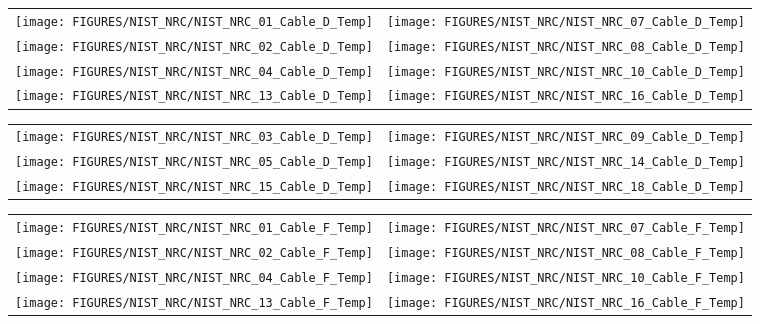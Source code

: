 \begin{figure}[p]
\begin{tabular*}{\textwidth}{l@{\extracolsep{\fill}}r}
\texttt{[image: FIGURES/NIST\_NRC/NIST\_NRC\_01\_Cable\_D\_Temp]} &
\texttt{[image: FIGURES/NIST\_NRC/NIST\_NRC\_07\_Cable\_D\_Temp]} \\
\texttt{[image: FIGURES/NIST\_NRC/NIST\_NRC\_02\_Cable\_D\_Temp]} &
\texttt{[image: FIGURES/NIST\_NRC/NIST\_NRC\_08\_Cable\_D\_Temp]} \\
\texttt{[image: FIGURES/NIST\_NRC/NIST\_NRC\_04\_Cable\_D\_Temp]} &
\texttt{[image: FIGURES/NIST\_NRC/NIST\_NRC\_10\_Cable\_D\_Temp]} \\
\texttt{[image: FIGURES/NIST\_NRC/NIST\_NRC\_13\_Cable\_D\_Temp]} &
\texttt{[image: FIGURES/NIST\_NRC/NIST\_NRC\_16\_Cable\_D\_Temp]}
\end{tabular*}
\label{NIST_NRC_Cable_D_Closed}
\end{figure}

\begin{figure}[p]
\begin{tabular*}{\textwidth}{l@{\extracolsep{\fill}}r}
\texttt{[image: FIGURES/NIST\_NRC/NIST\_NRC\_03\_Cable\_D\_Temp]} &
\texttt{[image: FIGURES/NIST\_NRC/NIST\_NRC\_09\_Cable\_D\_Temp]} \\
\texttt{[image: FIGURES/NIST\_NRC/NIST\_NRC\_05\_Cable\_D\_Temp]} &
\texttt{[image: FIGURES/NIST\_NRC/NIST\_NRC\_14\_Cable\_D\_Temp]} \\
\texttt{[image: FIGURES/NIST\_NRC/NIST\_NRC\_15\_Cable\_D\_Temp]} &
\texttt{[image: FIGURES/NIST\_NRC/NIST\_NRC\_18\_Cable\_D\_Temp]}
\end{tabular*}
\label{NIST_NRC_Cable_D_Open}
\end{figure}

\begin{figure}[p]
\begin{tabular*}{\textwidth}{l@{\extracolsep{\fill}}r}
\texttt{[image: FIGURES/NIST\_NRC/NIST\_NRC\_01\_Cable\_F\_Temp]} &
\texttt{[image: FIGURES/NIST\_NRC/NIST\_NRC\_07\_Cable\_F\_Temp]} \\
\texttt{[image: FIGURES/NIST\_NRC/NIST\_NRC\_02\_Cable\_F\_Temp]} &
\texttt{[image: FIGURES/NIST\_NRC/NIST\_NRC\_08\_Cable\_F\_Temp]} \\
\texttt{[image: FIGURES/NIST\_NRC/NIST\_NRC\_04\_Cable\_F\_Temp]} &
\texttt{[image: FIGURES/NIST\_NRC/NIST\_NRC\_10\_Cable\_F\_Temp]} \\
\texttt{[image: FIGURES/NIST\_NRC/NIST\_NRC\_13\_Cable\_F\_Temp]} &
\texttt{[image: FIGURES/NIST\_NRC/NIST\_NRC\_16\_Cable\_F\_Temp]}
\end{tabular*}
\label{NIST_NRC_Cable_F_Closed}
\end{figure}

